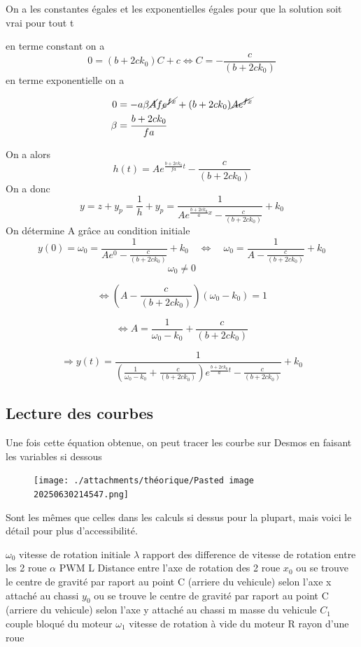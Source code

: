 \documentclass[a4paper,12pt]{report}  %
\begin{document}
On a les constantes égales et les exponentielles égales pour que la solution soit vrai pour tout t 

en terme constant on a
$$0 = (b + 2c k_0)C+c \Leftrightarrow C = -\frac{c}{(b + 2c k_0)}$$
en terme exponentielle on a 

\begin{align}
	0 &= -a \beta \cancel{A}f  \cancel{e^{f x}} + (b + 2c k_0) \cancel{A e^{f x}}
	\\
	\beta &= \frac{b + 2c k_0}{fa}
\end{align}

On a alors 
$$ h(t) = A e^{\frac{b + 2c k_0}{fa}t} - \frac{c}{(b + 2c k_0)}$$
On a donc
$$y = z + y_p =  \frac{1}{h} + y_p = \frac{1}{ A e^{\frac{b + 2c k_0}{a}x} - \frac{c}{(b + 2c k_0)}} + k_0$$
On détermine A grâce au condition initiale
$$y(0) = \omega_0 = \frac{1}{ A e^0 - \frac{c}{(b + 2c k_0)}} + k_0 \quad\Leftrightarrow \quad \omega_0 = \frac{1}{A - \frac{c}{(b + 2c k_0)}} + k_0$$
$$\omega_0 \neq 0$$

$$\Leftrightarrow (A-\frac{c}{(b + 2c k_0)})(\omega_0-k_0) = 1$$


$$\Leftrightarrow A = \frac{1}{\omega_0-k_0} + \frac{c}{(b + 2c k_0)}$$

$$\Rightarrow y(t) = \frac{1}{(\frac{1}{\omega_0-k_0} + \frac{c}{(b + 2c k_0)}) e^{\frac{b + 2c k_0}{a}t} - \frac{c}{(b + 2c k_0)}} + k_0$$

\subsection{Lecture des courbes}
Une fois cette équation obtenue, on peut tracer les courbe sur Desmos en faisant les variables si dessous 
\begin{figure}[H]
	\centering
	\texttt{[image: ./attachments/théorique/Pasted image 20250630214547.png]}
	\caption{}
\end{figure}

Sont les mêmes que celles dans les calculs si dessus pour la plupart, mais voici le détail pour plus d'accessibilité. 

$\omega_0$ vitesse de rotation initiale 
$\lambda$ rapport des difference de vitesse de rotation entre les 2 roue 
$\alpha$ PWM
L Distance entre l'axe de rotation des 2 roue 
$x_0$ ou se trouve le centre de gravité par raport au point C (arriere du vehicule) selon l'axe x attaché au chassi
$y_0$ ou se trouve le centre de gravité par raport au point C (arriere du vehicule) selon l'axe y attaché au chassi
m masse du vehicule
$C_1$ couple bloqué du moteur
$\omega_1$ vitesse de rotation à vide du moteur
R rayon d'une roue 
\end{document}
